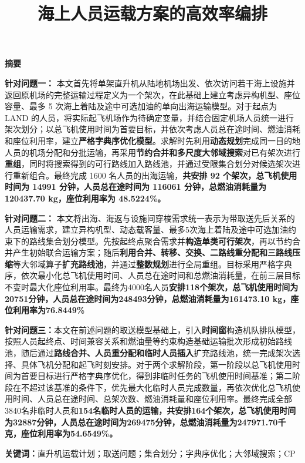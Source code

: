 \documentclass[UTF-8,a4paper,zihao=-4]{ctexart}
\makeatletter
\renewcommand{\maketitle}{
    \begin{center}
        \vspace*{-2cm}
        {\zihao{2}\heiti\@title\par}
    \end{center}
}
\renewenvironment{abstract}
{
    \begin{center}
        {\zihao{-3}\textbf{摘要}}
    \end{center}
    \zihao{-4}
}
{}
\makeatother
\begin{document}
\title{海上人员运载方案的高效率编排}
\date{}
\maketitle


\begin{abstract}

\textbf{针对问题一：} 本文首先将单架直升机从陆地机场出发、依次访问若干海上设施并返回原机场的完整运输过程定义为一个架次，在此基础上建立考虑异构机型、座位容量、最多 5 次海上着陆及途中可选加油的单向出海运输模型。对于起点为 LAND 的人员，将实际起飞机场作为待确定变量，并结合固定机场人员统一进行架次划分；以总飞机使用时间为首要目标，并依次考虑人员总在途时间、燃油消耗和座位利用率，建立\textbf{严格字典序优化模型}。求解时先利用\textbf{动态规划}完成同一目的地人员的机场分配和分批运输，再采用\textbf{节约合并和多尺度大邻域搜索}对已有架次进行\textbf{重组}，同时将搜索得到的可行路线加入路线池，并通过受限集合划分对候选架次进行重新组合。最终完成 1600 名人员的出海运输，\textbf{共安排 92 个架次，总飞机使用时间为 14991 分钟，人员总在途时间为 116061 分钟，总燃油消耗量为 120437.70 kg，座位利用率为 48.5224\%。}
    
\textbf{针对问题二：} 本文将出海、海返与设施间穿梭需求统一表示为带取送先后关系的人员运输需求，建立异构机型、动态载客量、最多5次海上着陆及途中可选加油约束下的路线集合划分模型。先按起终点聚合需求并\textbf{构造单类可行架次}，再以节约合并产生初始联合运输方案；随后\textbf{利用合并、转移、交换、二路线重分配和三路线压缩}等大邻域算子\textbf{扩充路线池}，并通过\textbf{整数规划}进行全局重组。目标采用严格字典序，依次最小化总飞机使用时间、人员总在途时间和总燃油消耗量，在前三层目标不变时最大化座位利用率。最终为4000名人员\textbf{安排118个架次，总飞机使用时间为20751分钟，人员总在途时间为248493分钟，总燃油消耗量为161473.10 kg，座位利用率为76.8449\%}
    
\textbf{针对问题三：}本文在前述问题的取送模型基础上，引入\textbf{时间窗}构造机队排队模型，按照人员起终点、时间兼容关系和燃油量等约束构造基础运输批次形成初始路线池，随后通过\textbf{路线合并、人员重分配和临时人员插入}扩充路线池，统一完成架次选择、具体飞机分配和起飞时刻安排。对于两个求解阶段，第一阶段以总飞机使用时间为首要目标进行严格字典序优化，得到非临时任务的飞机使用时间基准；第二阶段在不超过该基准的条件下，优先最大化临时人员完成数量，再依次优化总飞机使用时间、人员总在途时间、总架次数、燃油消耗量和座位利用率。最终完成全部3840名非临时人员和\textbf{154名临时人员的运输，共安排164个架次，总飞机使用时间为32887分钟，人员总在途时间为269475分钟，总燃油消耗量为247971.70千克，座位利用率为54.6549\%。}

\noindent \textbf{关键词：}直升机运载计划；取送问题；集合划分；字典序优化；大邻域搜索；CP

\end{abstract}
\end{document}
